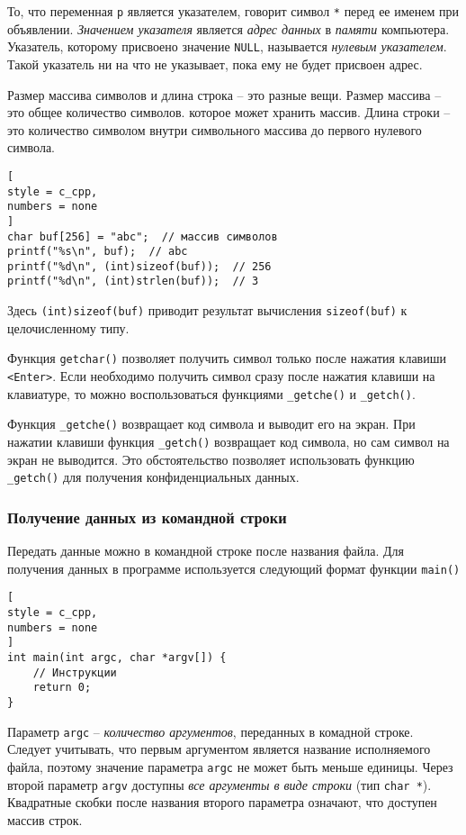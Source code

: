 \documentclass[%
	11pt,
	a4paper,
	utf8,
		]{article}
\begin{document}
То, что переменная \verb|p| является указателем, говорит символ \verb*|*| перед ее именем при объявлении. \emph{Значением указателя} является \emph{адрес данных} в \emph{памяти} компьютера. Указатель, которому присвоено значение \verb|NULL|, называется \emph{нулевым указателем}. Такой указатель ни на что не указывает, пока ему не будет присвоен адрес.

Размер массива символов и длина строка -- это разные вещи. Размер массива -- это общее количество символов. которое может хранить массив. Длина строки -- это количество символом внутри символьного массива до первого нулевого символа.
\begin{lstlisting}[
style = c_cpp,
numbers = none
]
char buf[256] = "abc";  // массив символов
printf("%s\n", buf);  // abc
printf("%d\n", (int)sizeof(buf));  // 256
printf("%d\n", (int)strlen(buf));  // 3
\end{lstlisting}

Здесь \verb*|(int)sizeof(buf)| приводит результат вычисления \verb|sizeof(buf)| к целочисленному типу.

Функция \verb*|getchar()| позволяет получить символ только после нажатия клавиши \verb|<Enter>|. Если необходимо получить символ сразу после нажатия клавиши на клавиатуре, то можно воспользоваться функциями \verb*|_getche()| и \verb|_getch()|.

Функция \verb*|_getche()| возвращает код символа и выводит его на экран. При нажатии клавиши функция \verb|_getch()| возвращает код символа, но сам символ на экран не выводится. Это обстоятельство позволяет использовать функцию \verb*|_getch()| для получения конфиденциальных данных.

\subsubsection{Получение данных из командной строки}

Передать данные можно в командной строке после названия файла. Для получения данных в программе используется следующий формат функции \verb|main()|
\begin{lstlisting}[
style = c_cpp,
numbers = none
]
int main(int argc, char *argv[]) {
    // Инструкции
    return 0;
}
\end{lstlisting}

Параметр \verb|argc| -- \emph{количество аргументов}, переданных в комадной строке. Следует учитывать, что первым аргументом является название исполняемого файла, поэтому значение параметра \verb*|argc| не может быть меньше единицы. Через второй параметр \verb*|argv| доступны \emph{все аргументы в виде строки} (тип \verb|char *|). Квадратные скобки после названия второго параметра означают, что доступен массив строк.
\end{document}
